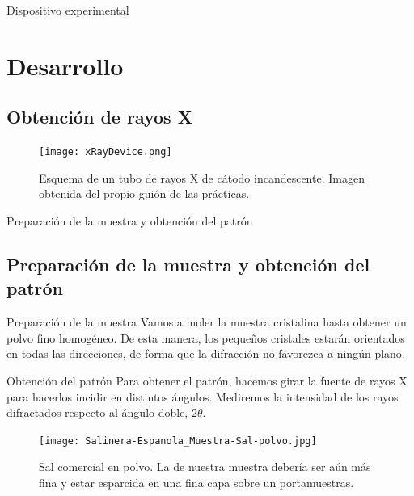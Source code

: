 \documentclass{beamer}
\begin{document}
\begin{frame}{Dispositivo experimental}
    \section{Desarrollo}
    \subsection{Obtención de rayos X}
    \begin{figure}[h!]
        \begin{center}
            \texttt{[image: xRayDevice.png]}
        \end{center}
        \caption{Esquema de un tubo de rayos X de cátodo incandescente. Imagen obtenida del propio guión de las prácticas.}
    \end{figure}
\end{frame}
\begin{frame}{Preparación de la muestra y obtención del patrón}
    \subsection{Preparación de la muestra y obtención del patrón}
    \begin{block}{Preparación de la muestra}
        Vamos a moler la muestra cristalina hasta obtener un polvo fino homogéneo. De esta manera, los pequeños cristales estarán orientados en todas las direcciones, de forma que la difracción no favorezca a ningún plano.
    \end{block}
    \begin{block}{Obtención del patrón}
        Para obtener el patrón, hacemos girar la fuente de rayos X para hacerlos incidir en distintos ángulos. Mediremos la intensidad de los rayos difractados respecto al ángulo doble, $2\theta$.
    \end{block}
    \begin{figure}[h!]
        \begin{center}
            \texttt{[image: Salinera-Espanola\_Muestra-Sal-polvo.jpg]}
        \end{center}
        \caption{Sal comercial en polvo. La de nuestra muestra debería ser aún más fina y estar esparcida en una fina capa sobre un portamuestras.}
    \end{figure}
\end{frame}
\end{document}
